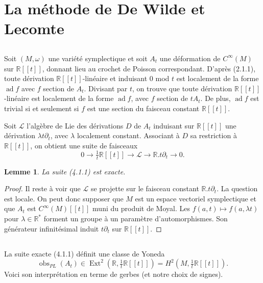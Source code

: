 \documentclass[11pt,a4paper]{article}
\theoremstyle{plain}
\newtheorem{lemma}[theorem]{Lemme}
\theoremstyle{definition}
\DeclareMathOperator{\Ext}{Ext}
\DeclareMathOperator{\ad}{ad}
\DeclareMathOperator{\obs}{obs}
\newcommand{\R}{\mathbb{R}}
\begin{document}
\section{La m\'ethode de De Wilde et Lecomte}

\subsection{}
Soit $(M,\omega)$ une vari\'et\'e symplectique et soit $A_{t}$ une d\'eformation de $C^{\infty}(M)$
sur $\R[[t]]$, donnant lieu au crochet de Poisson correspondant. D'apr\`es (2.1.1), toute
d\'erivation $\R[[t]]$-lin\'eaire et induisant $0$ mod $t$ est localement de la forme $\ad f$ avec
$f$ section de $A_{t}$. Divisant par $t$, on trouve que toute d\'erivation $\R[[t]]$-lin\'eaire est
localement de la forme $\ad f$, avec $f$ section de $tA_{t}$. De plus, $\ad f$ est trivial si et seulement si $f$ est une section du faisceau constant $\R[[t]]$.

Soit $\mathcal{L}$ l'alg\`ebre de Lie des d\'erivations $D$ de $A_{t}$ induisant sur $\R[[t]]$ une d\'erivation $\lambda t\partial_{t}$, avec $\lambda$ localement constant. Associant \`a $D$ sa restriction \`a $\R[[t]]$, on obtient une suite de faisceaux
\begin{equation}
0 \longrightarrow \tfrac{1}{t}\R[[t]] \longrightarrow \mathcal{L} \longrightarrow \R.t\partial_{t} \longrightarrow 0. \tag{4.1.1}
\end{equation}

\begin{lemma}
La suite (4.1.1) est exacte.
\end{lemma}

\begin{proof}
Il reste \`a voir que $\mathcal{L}$ se projette sur le faisceau constant $\R.t\partial_{t}$. La question
est locale. On peut donc supposer que $M$ est un espace vectoriel symplectique et
que $A_{t}$ est $C^{\infty}(M)[[t]]$ muni du produit de Moyal. Les $f(a,t) \mapsto f(a, \lambda t)$ pour $\lambda \in \R^{*}$ forment un groupe \`a un param\`etre d'automorphismes. Son g\'en\'erateur infinit\'esimal
induit $t\partial_{t}$ sur $\R[[t]]$.
\end{proof}

\subsection{}
La suite exacte (4.1.1) d\'efinit une classe de Yoneda
\[
\obs_{PL}(A_{t}) \in \Ext^{2}(\R, \tfrac{1}{t}\R[[t]]) = H^{2}(M, \tfrac{1}{t}\R[[t]]).
\]
Voici son interpr\'etation en terme de gerbes (et notre choix de signes).
\end{document}

